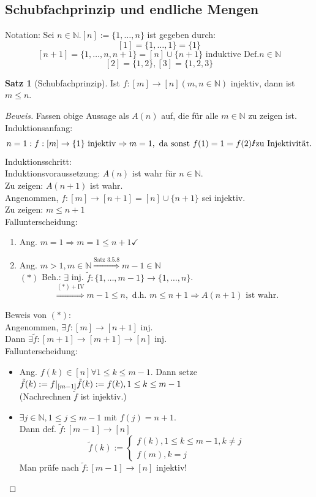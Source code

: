\documentclass[12pt,a4paper,titlepage]{article} %
\theoremstyle{definition}
\newtheorem{satz}{Satz}[subsection]
\theoremstyle{remark}
\newenvironment{bew}{\begin{proof}[Beweis]}{\end{proof}}
\begin{document}
\subsection{Schubfachprinzip und endliche Mengen}
Notation: Sei $n\in\mathbb{N}. [n] := \{1,\ldots,n\}$ ist gegeben durch:
$$[1] = \{1,\ldots,1\} = \{1\}$$
$$[n+1] = \{1,\ldots,n,n+1\} = [n] \cup \{n+1\}\text{ induktive Def.} n\in\mathbb{N}$$
$$[2]=\{1,2\}, [3]=\{1,2,3\}$$
\begin{satz}[Schubfachprinzip]
	Ist $f:[m]\rightarrow [n] (m,n\in\mathbb{N})$ injektiv, dann ist $m\leq n$.
\end{satz}
\begin{bew}
	Fassen obige Aussage als $A(n)$ auf, die für alle $m\in\mathbb{N}$ zu zeigen ist.\\
	Induktionsanfang: $$n=1: f:[m] \rightarrow \{1\} \text{ injektiv} \Rightarrow m=1, \text{ da sonst } f(1) = 1 = f(2) \text{\Lightning zu Injektivität}.$$
	Induktionsschritt:\\
	Induktionsvoraussetzung: $A(n)$ ist wahr für $n\in\mathbb{N}$.\\
	Zu zeigen: $A(n+1)$ ist wahr.\\
	Angenommen, $f:[m]\rightarrow[n+1] = [n] \cup \{n+1\}$ sei injektiv.\\
	Zu zeigen: $m\leq n+1$\\
	Fallunterscheidung:
	\begin{enumerate}
		\item Ang. $m=1 \Rightarrow m=1\leq n+1\checkmark$
		\item Ang. $m>1, m\in\mathbb{N} \overset{\text{Satz 3.5.8}}{\Rightarrow} m-1\in\mathbb{N}$\\
		$(*)$ Beh.: $\exists$ inj. $\tilde{f}: \{1,\ldots,m-1\}\rightarrow\{1,\ldots,n\}$.\\
		$$\overset{(*) + \text{IV}}{\Rightarrow} m-1\leq n, \text{ d.h. } m\leq n+1 \Rightarrow A(n+1) \text{ ist wahr}.$$		
	\end{enumerate}
	Beweis von $(*)$:\\
	Angenommen, $\exists f: [m]\rightarrow[n+1]$ inj.\\
	Dann $\exists \tilde{f}: [m+1]\rightarrow [m+1]\rightarrow[n]$ inj.\\
	Fallunterscheidung:
	\begin{itemize}
		\item Ang. $f(k)\in [n] \forall 1\leq k \leq m-1$. Dann setze $\tilde{f}(k) := f\vert_{[m-1]}\\
		\tilde{f}(k) := f(k), 1\leq k\leq m-1$\\
		(Nachrechnen $\tilde{f}$ ist injektiv.)
		\item $\exists j\in\mathbb{N}, 1\leq j\leq m-1$ mit $f(j) = n+1$.\\
		Dann def. $\tilde{f}: [m-1]\rightarrow [n]$
		$$\tilde{f}(k) :=
		\begin{cases}
			f(k), 1 \leq k \leq m-1, k\neq j\\
			f(m), k=j
		\end{cases}$$
		Man prüfe nach $\tilde{f}: [m-1]\rightarrow [n]$ injektiv!
	\end{itemize}
\end{bew}
\end{document}
